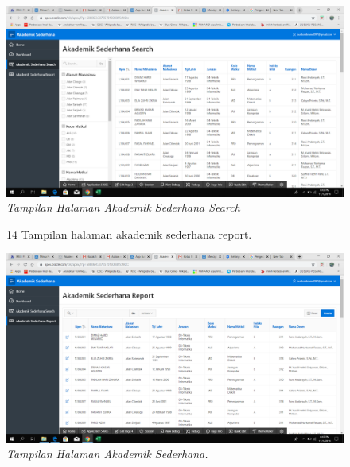 \begin{enumerate}
\begin{figure}
    \begin{center}
\includegraphics[scale=0.2]{figures/ss13.png}
    \caption{\textit{Tampilan Halaman Akademik Sederhana Search}}
        \end{center}
\label{gambar}
\end{figure}

\begin{figure}
\item[14] Tampilan halaman akademik sederhana report.

    \begin{center}
\includegraphics[scale=0.2]{figures/ss14.png}
    \caption{\textit{Tampilan Halaman Akademik Sederhana.}}
        \end{center}
\label{gambar}
\end{figure}

\end{enumerate}
